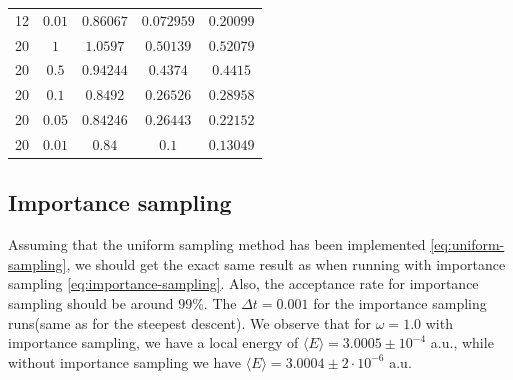 \documentclass[11pt]{article}
\begin{document}
\begin{table}[H]
\begin{tabular}{c c c c c}
		12 &$           0.01$ &$        0.86067$ &$       0.072959$ &$        0.20099$ \\ 
		20 &$              1$ &$         1.0597$ &$        0.50139$ &$        0.52079$ \\ 
		20 &$            0.5$ &$        0.94244$ &$         0.4374$ &$         0.4415$ \\ 
		20 &$            0.1$ &$         0.8492$ &$        0.26526$ &$        0.28958$ \\ 
		20 &$           0.05$ &$        0.84246$ &$        0.26443$ &$        0.22152$ \\ 
		20 &$           0.01$ &$           0.84$ &$            0.1$ &$        0.13049$ \\ 
		\hline \hline
	\end{tabular}
	\label{tab:optimal-parameters}
\end{table}

\subsection{Importance sampling}
Assuming that the uniform sampling method has been implemented \eqref{eq:uniform-sampling}, we should get the exact same result as when running with importance sampling \eqref{eq:importance-sampling}. Also, the acceptance rate for importance sampling should be around $99\%$\citet{komp2015}. The $\Delta t = 0.001$ for the importance sampling runs(same as for the steepest descent). We observe that for $\omega=1.0$ with importance sampling, we have a local energy of $\langle E\rangle = 3.0005\pm 10^{-4}$ a.u., while without importance sampling we have $\langle E\rangle = 3.0004\pm 2\cdot10^{-6}$ a.u.
\end{document}
